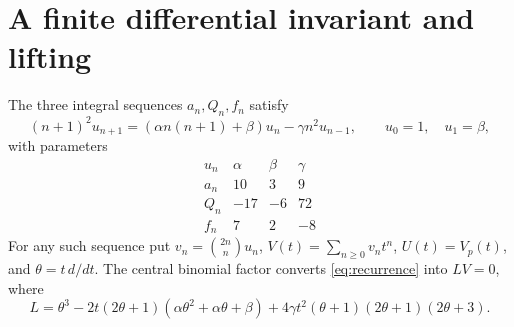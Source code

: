 \documentclass[11pt,a4paper]{article}
\theoremstyle{remark}
\begin{document}
\section{A finite differential invariant and lifting}\label{sec:invariant}
The three integral sequences $a_n,Q_n,f_n$ satisfy
\cite[pp.~2729--2730]{sun}
\begin{equation}\label{eq:recurrence}
 (n+1)^2u_{n+1}=(\alpha n(n+1)+\beta)u_n-\gamma n^2u_{n-1},
 \qquad u_0=1,\quad u_1=\beta,
\end{equation}
with parameters
\begin{equation}\label{eq:parameters}
\begin{array}{c|rrr}
u_n&\alpha&\beta&\gamma\\\hline
a_n&10&3&9\\
Q_n&-17&-6&72\\
f_n&7&2&-8
\end{array}
\end{equation}
For any such sequence put $v_n=\binom{2n}n u_n$,
$V(t)=\sum_{n\ge0}v_nt^n$, $U(t)=V_p(t)$, and $\theta=t\,d/dt$.
The central binomial factor converts \eqref{eq:recurrence} into $LV=0$,
where
\begin{equation}\label{eq:operator}
 L=\theta^3-2t(2\theta+1)(\alpha\theta^2+\alpha\theta+\beta)
       +4\gamma t^2(\theta+1)(2\theta+1)(2\theta+3).
\end{equation}
\end{document}
